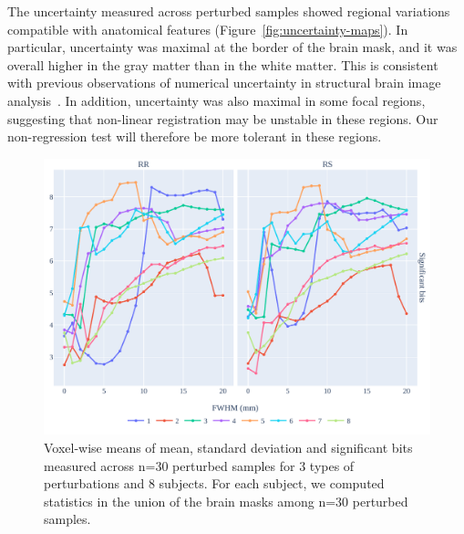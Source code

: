 \documentclass{article}
\begin{document}
The uncertainty measured across perturbed samples showed regional variations compatible with anatomical features (Figure~\ref{fig:uncertainty-maps}). In particular, uncertainty was
maximal at the border of the brain mask, and it was overall higher in the gray matter than in the white matter.
This is consistent with previous observations of numerical uncertainty in structural brain image analysis~\cite{salari2021accurate}.
In addition, uncertainty was also maximal in some focal regions, suggesting that non-linear registration may be unstable in these regions. Our non-regression test will therefore be more tolerant in these regions.

\begin{figure}
    \centering
    \includegraphics[width=\linewidth]{figures/stats.pdf}
    \caption{Voxel-wise means of mean, standard deviation and significant bits
        measured across n=30 perturbed samples for 3 types of perturbations and 8
        subjects. For each subject, we computed statistics in the union of the brain
        masks among n=30 perturbed samples.}
    \label{fig:significant-digits}
\end{figure}
\end{document}
